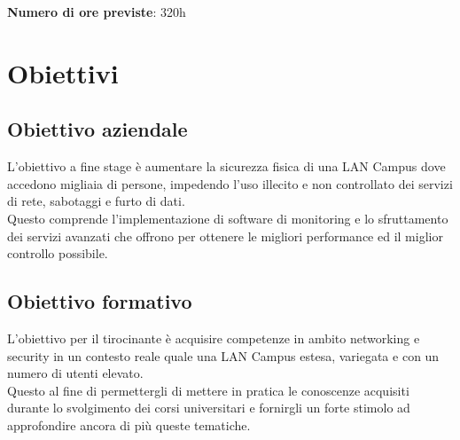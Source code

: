 \documentclass[Tesi.tex]{subfiles}
\begin{document}
\textbf{Numero di ore previste}: 320h

\section{Obiettivi}
\subsection{Obiettivo aziendale}
L'obiettivo a fine stage è aumentare la sicurezza fisica di una LAN Campus dove accedono migliaia di
persone, impedendo l'uso illecito e non controllato dei servizi di rete, sabotaggi e furto di dati. \\
Questo comprende l'implementazione di software di monitoring e lo sfruttamento dei servizi avanzati che offrono per ottenere le migliori performance ed il miglior controllo possibile.

\subsection{Obiettivo formativo}
L'obiettivo per il tirocinante è acquisire competenze in ambito networking e security in un contesto reale quale una LAN Campus estesa, variegata e con un numero di utenti elevato. \\
Questo al fine di permettergli di mettere in pratica le conoscenze acquisiti durante lo svolgimento dei corsi universitari e fornirgli un forte stimolo ad approfondire ancora di più queste tematiche.
\end{document}
